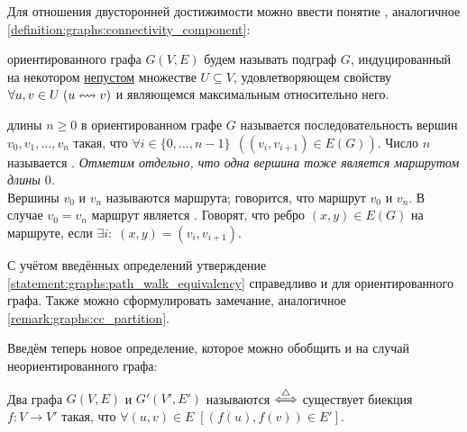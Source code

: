 Для отношения двусторонней достижимости можно ввести понятие , аналогичное \ref{definition:graphs:connectivity_component}:

\begin{definition}
    \label{definition:oriented_graphs:strong_connectivity_component}
     ориентированного графа $ G(V, E) $ будем называть подграф $ G $,
    индуцированный на некотором \underline{непустом} множестве $ U \subseteq V $,
    удовлетворяющем свойству $ \forall u, v \in U \; (u \leftrightsquigarrow v) $ и являющемся максимальным относительно него.
\end{definition}

\begin{definition}
     длины $ n \geqslant 0 $ в ориентированном графе $ G $ называется последовательность вершин $ v_0, v_1, \ldots, v_n $ такая,
    что $ \forall i \in \{ 0, \ldots, n-1 \} \;\, \left( (v_i, v_{i+1}) \in E(G) \right) $.
    \newline
    Число $ n $ называется .
    \textit{Отметим отдельно, что одна вершина тоже является маршрутом длины $ 0 $.}
    \\[0.25\baselineskip]
    Вершины $ v_0 $ и $ v_n $ называются  маршрута;
    говорится, что маршрут  $ v_0 $ и $ v_n $.
    В случае $ v_0 = v_n $ маршрут является .
    \newline
    Говорят, что ребро $ (x, y) \in E(G) $  на маршруте, если $ \exists i: \; (x, y) = (v_i, v_{i+1}) $.
\end{definition}

С учётом введённых определений утверждение \ref{statement:graphs:path_walk_equivalency} справедливо и для ориентированного графа.
Также можно сформулировать замечание, аналогичное \ref{remark:graphs:cc_partition}.

Введём теперь новое определение, которое можно обобщить и на случай неориентированного графа:
\begin{definition}
    Два графа $ G(V, E) $ и $ G'(V', E') $ называются  $ \overset{\triangle}{\Longleftrightarrow} $ существует биекция $ f: V \to V' $ такая,
    что $ \forall (u, v) \in E \; \left[ (f(u), f(v)) \in E' \right] $.
\end{definition}
